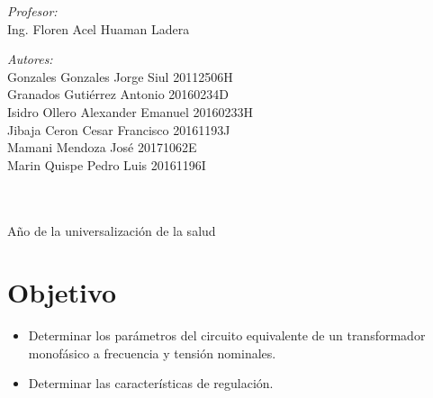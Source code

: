 \documentclass[12pt]{article}
\makeatletter
\let\thedate\@date
\makeatother
\begin{document}
\begin{titlepage}
	\begin{minipage}{0.9\textwidth}
		\begin{flushleft} \large
			\emph{Profesor:}\\
			Ing. Floren Acel Huaman Ladera\newline
		\end{flushleft}
	\end{minipage}
	\begin{minipage}{0.9\textwidth}
		\begin{flushleft} \large
			\emph{Autores:}\\
			Gonzales Gonzales Jorge Siul 	20112506H\\
            Granados Gutiérrez Antonio 	20160234D\\
            Isidro Ollero Alexander Emanuel	20160233H\\
            Jibaja Ceron Cesar Francisco 	20161193J\\
            Mamani Mendoza José 		20171062E\\
            Marin Quispe Pedro Luis 		20161196I\\
		\end{flushleft}
	\end{minipage}~
	\\[0.5 cm]\thedate\\
	Año de la universalización de la salud
\end{titlepage}


\tableofcontents
\pagebreak


\section{Objetivo}
\begin{itemize}
    \item Determinar los parámetros del circuito equivalente de un transformador monofásico a frecuencia y tensión nominales.
    \item Determinar las características de regulación.
\end{itemize}
\end{document}
